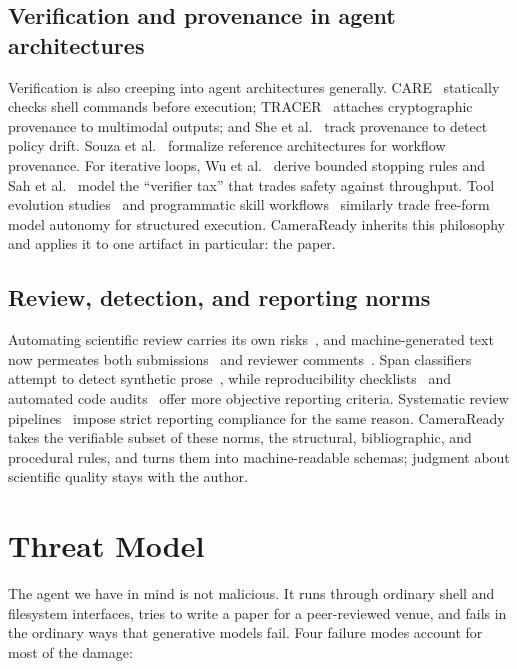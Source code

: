 \documentclass[conference]{IEEEtran}
\begin{document}
\subsection{Verification and provenance in agent architectures}
Verification is also creeping into agent architectures generally. CARE~\cite{liu2026care} statically checks shell commands before execution; TRACER~\cite{yu2026tracer} attaches cryptographic provenance to multimodal outputs; and She et al.~\cite{she2026safeguarding} track provenance to detect policy drift. Souza et al.~\cite{souza2025llm} formalize reference architectures for workflow provenance. For iterative loops, Wu et al.~\cite{wu2026verify} derive bounded stopping rules and Sah et al.~\cite{sah2026the} model the ``verifier tax'' that trades safety against throughput. Tool evolution studies~\cite{xu2026the} and programmatic skill workflows~\cite{liu2026harnessing} similarly trade free-form model autonomy for structured execution. CameraReady inherits this philosophy and applies it to one artifact in particular: the paper.

\subsection{Review, detection, and reporting norms}
Automating scientific review carries its own risks~\cite{ye2024are,akella2025pre}, and machine-generated text now permeates both submissions~\cite{zhou2025large} and reviewer comments~\cite{wu2026impact}. Span classifiers attempt to detect synthetic prose~\cite{yin2025span}, while reproducibility checklists~\cite{pineau2020improving} and automated code audits~\cite{akdeniz2023an} offer more objective reporting criteria. Systematic review pipelines~\cite{huang2026lumen,lin2026meta,chen2025large} impose strict reporting compliance for the same reason. CameraReady takes the verifiable subset of these norms, the structural, bibliographic, and procedural rules, and turns them into machine-readable schemas; judgment about scientific quality stays with the author.

\section{Threat Model}
\label{sec:threat}

The agent we have in mind is not malicious. It runs through ordinary shell and filesystem interfaces, tries to write a paper for a peer-reviewed venue, and fails in the ordinary ways that generative models fail. Four failure modes account for most of the damage:
\end{document}
